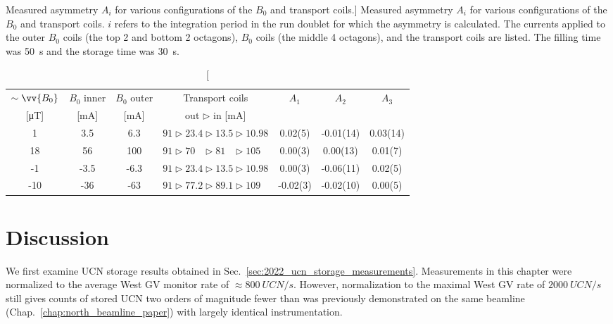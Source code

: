 \begin{table}
\centering
\caption
[Measured asymmetry $A_i$ for various configurations of the $B_0$ and transport coils.]
{Measured asymmetry $A_i$ for various configurations of the $B_0$ and transport coils. $i$ refers to the integration period in the run doublet for which the asymmetry is calculated. The currents applied to the outer $B_0$ coils (the top 2 and bottom 2 octagons), $B_0$ coils (the middle 4 octagons), and the transport coils are listed. The filling time was \qty{50}{s} and the storage time was \qty{30}{s}.}\label{tb:t1_2022_measurements}
\begin{tabular}{
    S[table-format = 2.0]
    S
    S
    c
    S[table-format = 1.2(2)]
    S[table-format = 1.2(2)]
    S[table-format = 1.2(2)]
}
\toprule
{$\sim\vv{B_0}$} 	& {$B_0$ inner}	& {$B_0$ outer} & {Transport coils} & {$A_1$} & {$A_2$} & {$A_3$}\\
{[\unit{\micro\tesla}]} 	& {[mA]}	& {[mA]} & {out $\triangleright$ in [mA]} & {} & {} & {}\\
 & 3.5 & 6.3 & {$91\triangleright 23.4 \triangleright 13.5 \triangleright 10.98$} & 0.02(5) & -0.01(14) & 0.03(14) \\
18 & 56 & 100 & {$91\triangleright 70\phantom{.0} \triangleright 81\phantom{.0} \triangleright 105\phantom{.0}$} & 0.00(3) & 0.00(13) & 0.01(7) \\
-1 & -3.5 & -6.3 & {$91\triangleright 23.4 \triangleright 13.5 \triangleright 10.98$} & 0.00(3) & -0.06(11) & 0.02(5) \\
-10 & -36 & -63 & {$91\triangleright 77.2 \triangleright 89.1 \triangleright 109\phantom{.0}$} & -0.02(3) & -0.02(10) & 0.00(5) \\
\bottomrule
\end{tabular}
\end{table}



\section{Discussion}


We first examine UCN storage results obtained in Sec.~\ref{sec:2022_ucn_storage_measurements}. Measurements in this chapter were normalized to the average West GV monitor rate of $\approx \qty{800}{UCN \per s}$. However, normalization to the maximal West GV rate of $\qty{2000}{UCN \per s}$ still gives counts of stored UCN two orders of magnitude fewer than was previously demonstrated on the same beamline (Chap.~\ref{chap:north_beamline_paper}) with largely identical instrumentation.


